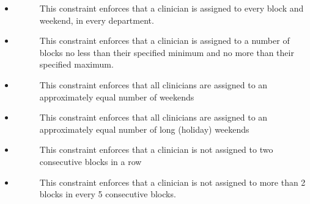 \documentclass[letterpaper,10pt,english]{sphinxmanual}
\begin{document}
\begin{itemize}
\item {} \begin{description}
\item[{}] \leavevmode
This constraint enforces that a clinician is assigned to every block
and weekend, in every department.

\end{description}

\item {} \begin{description}
\item[{}] \leavevmode
This constraint enforces that a clinician is assigned to a number
of blocks no less than their specified minimum and no more than
their specified maximum.

\end{description}

\item {} \begin{description}
\item[{}] \leavevmode
This constraint enforces that all clinicians are assigned to an
approximately equal number of weekends

\end{description}

\item {} \begin{description}
\item[{}] \leavevmode
This constraint enforces that all clinicians are assigned to an
approximately equal number of long (holiday) weekends

\end{description}

\item {} \begin{description}
\item[{}] \leavevmode
This constraint enforces that a clinician is not assigned to two
consecutive blocks in a row

\end{description}

\item {} \begin{description}
\item[{}] \leavevmode
This constraint enforces that a clinician is not assigned to more than
2 blocks in every 5 consecutive blocks.


\end{description}
\end{itemize}
\end{document}
